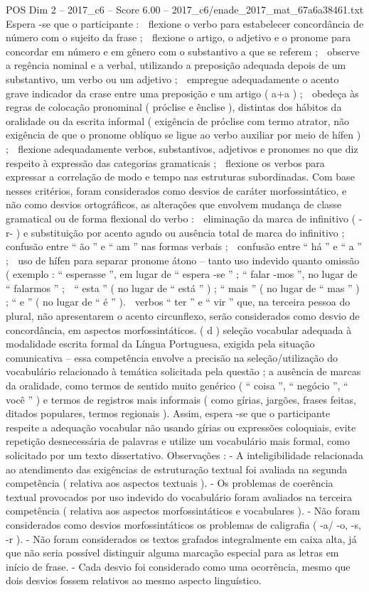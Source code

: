 \begin{textsample}{POS Dim 2 – 2017\_c6 – Score 6.00 – 2017\_c6/enade\_2017\_mat\_67a6a38461.txt}
Espera -se que o participante :  flexione o verbo para estabelecer concordância de número com o sujeito da frase ;  flexione o artigo, o adjetivo e o pronome para concordar em número e em gênero com o substantivo a que se referem ;  observe a regência nominal e a verbal, utilizando a preposição adequada depois de um substantivo, um verbo ou um adjetivo ;  empregue adequadamente o acento grave indicador da crase entre uma preposição e um artigo ( a+a ) ;  obedeça às regras de colocação pronominal ( próclise e ênclise ), distintas dos hábitos da oralidade ou da escrita informal ( exigência de próclise com termo atrator, não exigência de que o pronome oblíquo se ligue ao verbo auxiliar por meio de hífen ) ;  flexione adequadamente verbos, substantivos, adjetivos e pronomes no que diz respeito à expressão das categorias gramaticais ;  flexione os verbos para expressar a correlação de modo e tempo nas estruturas subordinadas.
Com base nesses critérios, foram considerados como desvios de caráter morfossintático, e não como desvios ortográficos, as alterações que envolvem mudança de classe gramatical ou de forma flexional do verbo :  eliminação da marca de infinitivo ( -r- ) e substituição por acento agudo ou ausência total de marca do infinitivo ;  confusão entre “ ão ” e “ am ” nas formas verbais ;  confusão entre “ há ” e “ a ” ;  uso de hífen para separar pronome átono – tanto uso indevido quanto omissão ( exemplo : “ esperasse ”, em lugar de “ espera -se ” ; “ falar -mos ”, no lugar de “ falarmos ” ;  “ esta ” ( no lugar de “ está ” ) ; “ mais ” ( no lugar de “ mas ” ) ; “ e ” ( no lugar de “ é ” ).  verbos “ ter ” e “ vir ” que, na terceira pessoa do plural, não apresentarem o acento circunflexo, serão considerados como desvio de concordância, em aspectos morfossintáticos. ( d ) seleção vocabular adequada à modalidade escrita formal da Língua Portuguesa, exigida pela situação comunicativa – essa competência envolve a precisão na seleção/utilização do vocabulário relacionado à temática solicitada pela questão ; a ausência de marcas da oralidade, como termos de sentido muito genérico ( “ coisa ”, “ negócio ”, “ você ” ) e termos de registros mais informais ( como gírias, jargões, frases feitas, ditados populares, termos regionais ).
Assim, espera -se que o participante respeite a adequação vocabular não usando gírias ou expressões coloquiais, evite repetição desnecessária de palavras e utilize um vocabulário mais formal, como solicitado por um texto dissertativo.
Observações : - A inteligibilidade relacionada ao atendimento das exigências de estruturação textual foi avaliada na segunda competência ( relativa aos aspectos textuais ). - Os problemas de coerência textual provocados por uso indevido do vocabulário foram avaliados na terceira competência ( relativa aos aspectos morfossintáticos e vocabulares ). - Não foram considerados como desvios morfossintáticos os problemas de caligrafia ( -a/ -o, -s, -r ). - Não foram considerados os textos grafados integralmente em caixa alta, já que não seria possível distinguir alguma marcação especial para as letras em início de frase. - Cada desvio foi considerado como uma ocorrência, mesmo que dois desvios fossem relativos ao mesmo aspecto linguístico.

\end{textsample}

